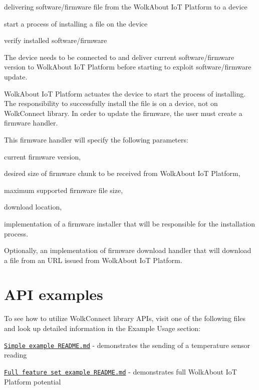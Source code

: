\begin{DoxyItemize}
\item delivering software/firmware file from the Wolk\+About IoT Platform to a device
\item start a process of installing a file on the device
\item verify installed software/firmware
\end{DoxyItemize}

The device needs to be connected to and deliver current software/firmware version to Wolk\+About IoT Platform before starting to exploit software/firmware update.

Wolk\+About IoT Platform actuates the device to start the process of installing. The responsibility to successfully install the file is on a device, not on Wolk\+Connect library. In order to update the firmware, the user must create a firmware handler.

This firmware handler will specify the following parameters\+:


\begin{DoxyItemize}
\item current firmware version,
\item desired size of firmware chunk to be received from Wolk\+About IoT Platform,
\item maximum supported firmware file size,
\item download location,
\item implementation of a firmware installer that will be responsible for the installation process.
\item Optionally, an implementation of firmware download handler that will download a file from an U\+RL issued from Wolk\+About IoT Platform.
\end{DoxyItemize}



 \section*{A\+PI examples}



 To see how to utilize Wolk\+Connect library A\+P\+Is, visit one of the following files and look up detailed information in the Example Usage section\+:


\begin{DoxyItemize}
\item \href{md_README.html}{\tt Simple example R\+E\+A\+D\+M\+E.\+md} -\/ demonstrates the sending of a temperature sensor reading
\item \href{md_examples_full_feature_set_README.html}{\tt Full feature set example R\+E\+A\+D\+M\+E.\+md} -\/ demonstrates full Wolk\+About IoT Platform potential 
\end{DoxyItemize}